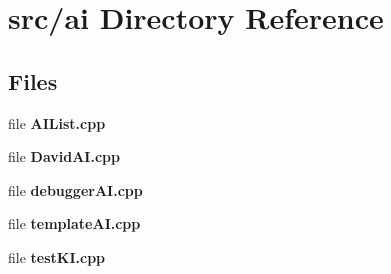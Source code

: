 \section{src/ai Directory Reference}
\label{dir_128a93aeeff33a8423f079f46929dbb3}
\subsection*{Files}
\begin{DoxyCompactItemize}
\item 
file {\bfseries A\-I\-List.\-cpp}
\item 
file {\bfseries David\-A\-I.\-cpp}
\item 
file {\bfseries debugger\-A\-I.\-cpp}
\item 
file {\bfseries template\-A\-I.\-cpp}
\item 
file {\bfseries test\-K\-I.\-cpp}
\end{DoxyCompactItemize}
